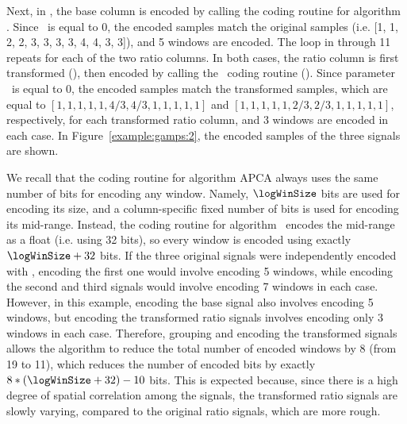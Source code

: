 Next, in , the base column is encoded by calling the coding routine for algorithm \apcaF. Since \epsilonB\ is equal to 0, the encoded samples match the original samples (i.e. [1, 1, 2, 2, 3, 3, 3, 3, 4, 4, 3, 3]), and 5 windows are encoded. The loop in  through 11 repeats for each of the two ratio columns. In both cases, the ratio column is first transformed (), then encoded by calling the \apcaF\ coding routine (). Since parameter \epsilonR\ is equal to 0, the encoded samples match the transformed samples, which are equal to $[1, 1, 1, 1, 1, 4/3, 4/3, 1, 1, 1, 1, 1]$ and $[1, 1, 1, 1, 1, 2/3, 2/3, 1, 1, 1, 1, 1]$, respectively, for each transformed ratio column, and 3 windows are encoded in each case. In Figure~\ref{example:gamps:2}, the encoded samples of the three signals are shown. 


\vspace{+5pt}


We recall that the coding routine for algorithm APCA always uses the same number of bits for encoding any window. Namely, $\logWinSize$ bits are used for encoding its size, and a column-specific fixed number of bits is used for encoding its mid-range. Instead, the coding routine for algorithm \apcaF\ encodes the mid-range as a float (i.e. using 32 bits), so every window is encoded using exactly $\logWinSize + 32$ bits. If the three original signals were independently encoded with \apcaF, encoding the first one would involve encoding 5 windows, while encoding the second and third signals would involve encoding 7 windows in each case. However, in this example, encoding the base signal also involves encoding 5 windows, but encoding the transformed ratio signals involves encoding only 3 windows in each case. Therefore, grouping and encoding the transformed signals allows the algorithm to reduce the total number of encoded windows by 8 (from 19 to 11), which reduces the number of encoded bits by exactly $8*(\logWinSize + 32) - 10$ bits. This is expected because, since there is a high degree of spatial correlation among the signals, the transformed ratio signals are slowly varying, compared to the original ratio signals, which are more rough.


\clearpage




